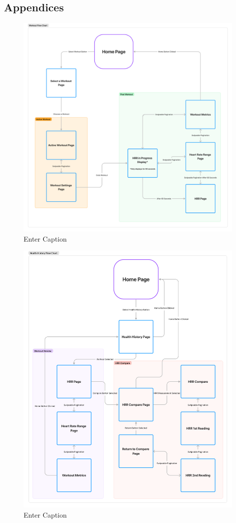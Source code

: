 \documentclass{l4proj}
\begin{document}
\begin{appendices}

\chapter{Appendices}
\label{sec:appendices}

\begin{figure}[h!]
    \centering
    \includegraphics[width=0.75\linewidth]{dissertation//dissImages/WorkoutFlow.pdf}
    \caption{Enter Caption}
    \label{fig:enter-label}
\end{figure}

\begin{figure}[h!]
    \centering
    \includegraphics[width=0.75\linewidth]{dissertation//dissImages/HealthHistoryFlow.pdf}
    \caption{Enter Caption}
    \label{fig:enter-label}
\end{figure}


\end{appendices}
\end{document}
